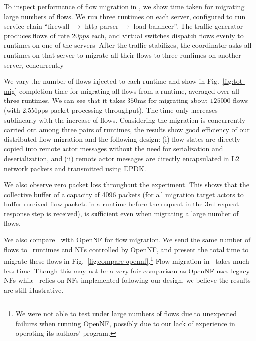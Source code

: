 To inspect performance of flow migration in \nfactor, we show time taken for migrating large numbers of flows. We run three runtimes on each server, configured to run service chain ``firewall $\rightarrow$ http parser $\rightarrow$ load balancer''. The traffic generator produces flows of rate $20pps$ each, and virtual switches dispatch flows evenly to runtimes on one of the servers. %
 After the traffic stabilizes, the coordinator asks all runtimes on that server to migrate all their flows to three runtimes on another server, concurrently.

We vary the number of flows injected to each runtime and show in Fig.~\ref{fig:tot-mig} completion time for migrating all flows from a runtime, averaged over all three runtimes. We can see that it takes $350$ms for migrating about $125000$ flows (with 2.5Mpps packet processing throughput). %
The time only increases sublinearly with the increase of flows. Considering the migration is concurrently carried out among three pairs of runtimes, the results show good efficiency of our distributed flow migration and the following design:
(i) flow states are directly copied into remote actor messages without the need for serialization and deserialization, and (ii) remote actor messages are directly encapsulated in L2 network packets and transmitted using DPDK. %

We also observe zero packet loss throughout the experiment. %
 This shows that the collective buffer of a capacity of 4096 packets (for all migration target actors to buffer received flow packets in a runtime before the request in the 3rd request-response step is received), is sufficient even when migrating a large number of flows. %

We also compare \nfactor~with OpenNF \cite{gember2015opennf} for flow migration. We send the same number of flows to \nfactor~runtimes and NFs controlled by OpenNF, and present the total time to migrate these flows in Fig.~\ref{fig:compare-opennf}.\footnote{We were not able to test under large numbers of flows due to unexpected failures when running OpenNF, possibly due to our lack of experience in operating its authors' program.} Flow migration in \nfactor~takes much less time. Though this may not be a very fair comparison as OpenNF uses legacy NFs while \nfactor~relies on NFs implemented following our design, we believe the results are still illustrative.

